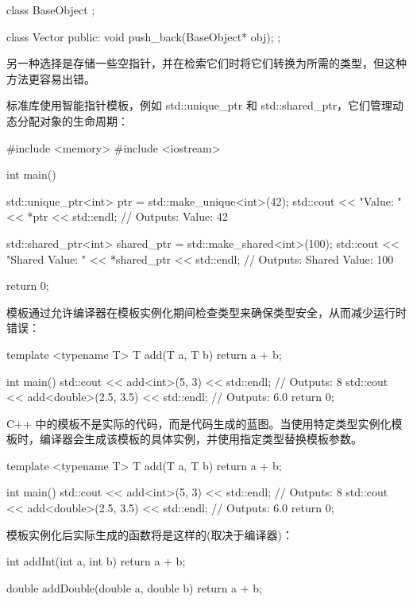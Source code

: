 \begin{cpp}
class BaseObject {};

class Vector {
    public:
        void push_back(BaseObject* obj);
};
\end{cpp}

另一种选择是存储一些空指针，并在检索它们时将它们转换为所需的类型，但这种方法更容易出错。

标准库使用智能指针模板，例如 std::unique\_ptr 和 std::shared\_ptr，它们管理动态分配对象的生命周期：

\begin{cpp}
#include <memory>
#include <iostream>

int main() {
    std::unique_ptr<int> ptr = std::make_unique<int>(42);
    std::cout << "Value: " << *ptr << std::endl; // Outputs: Value: 42

    std::shared_ptr<int> shared_ptr = std::make_shared<int>(100);
    std::cout << "Shared Value: " << *shared_ptr << std::endl; // Outputs: Shared Value: 100

    return 0;
}
\end{cpp}

模板通过允许编译器在模板实例化期间检查类型来确保类型安全，从而减少运行时错误：

\begin{cpp}
template <typename T>
T add(T a, T b) {
    return a + b;
}

int main() {
    std::cout << add<int>(5, 3) << std::endl; // Outputs: 8
    std::cout << add<double>(2.5, 3.5) << std::endl; // Outputs: 6.0
    return 0;
}
\end{cpp}


C++ 中的模板不是实际的代码，而是代码生成的蓝图。当使用特定类型实例化模板时，编译器会生成该模板的具体实例，并使用指定类型替换模板参数。


\begin{cpp}
template <typename T>
T add(T a, T b) {
    return a + b;
}

int main() {
    std::cout << add<int>(5, 3) << std::endl; // Outputs: 8
    std::cout << add<double>(2.5, 3.5) << std::endl; // Outputs: 6.0
    return 0;
}
\end{cpp}

模板实例化后实际生成的函数将是这样的(取决于编译器)：

\begin{cpp}
int addInt(int a, int b) {
    return a + b;
}

double addDouble(double a, double b) {
    return a + b;
}
\end{cpp}

